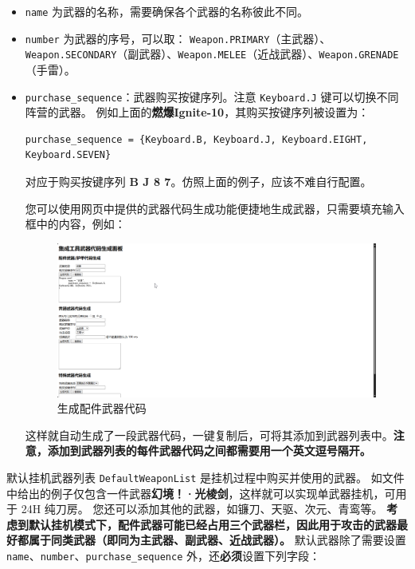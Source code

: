 \begin{itemize}
\item \lstinline{name} 为武器的名称，需要确保各个武器的名称彼此不同。
\item \lstinline{number} 为武器的序号，可以取：
\lstinline{Weapon.PRIMARY}（主武器）、\lstinline{Weapon.SECONDARY}（副武器）、\lstinline{Weapon.MELEE}（近战武器）、\lstinline{Weapon.GRENADE}（手雷）。
\item \lstinline{purchase_sequence}：武器购买按键序列。注意 \lstinline{Keyboard.J} 键可以切换不同阵营的武器。
例如上面的\textbf{\color{red}燃爆Ignite-10}，其购买按键序列被设置为：

\begin{verbatim}
purchase_sequence = {Keyboard.B, Keyboard.J, Keyboard.EIGHT, Keyboard.SEVEN}
\end{verbatim}

对应于购买按键序列 \textbf{\color{red}B J 8 7}。仿照上面的例子，应该不难自行配置。

您可以使用网页中提供的武器代码生成功能便捷地生成武器，只需要填充输入框中的内容，例如：

\begin{figure}[H]
    \Centering
    \includegraphics[width=\textwidth]{docs/assets/generate_part_weapon_code}
    \caption{生成配件武器代码}
\end{figure}

这样就自动生成了一段武器代码，一键复制后，可将其添加到武器列表中。\textbf{\color{red}注意，添加到武器列表的每件武器代码之间都需要用一个英文逗号隔开。}

\end{itemize}

默认挂机武器列表 \lstinline{DefaultWeaponList} 是挂机过程中购买并使用的武器。
如文件中给出的例子仅包含一件武器\textbf{\color{red}幻境！·光棱剑}，这样就可以实现单武器挂机，可用于 24H 纯刀房。
您还可以添加其他的武器，如镰刀、天驱、次元、青鸾等。
\textbf{\color{red} 考虑到默认挂机模式下，配件武器可能已经占用三个武器栏，因此用于攻击的武器最好都属于同类武器（即同为主武器、副武器、近战武器）。}
默认武器除了需要设置 \lstinline{name}、\lstinline{number}、\lstinline{purchase_sequence} 外，还\textbf{\color{red}必须}设置下列字段：

